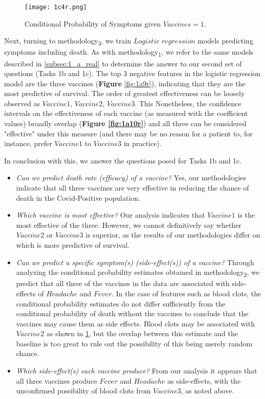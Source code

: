\begin{figure}[H]
  \texttt{[image: 1c4r.png]}
  \caption{Conditional  Probability  of  Symptoms  given $Vaccines = 1$.}
    \label{fig:1c4r}
\end{figure}


Next, turning to methodology\textsubscript{3}, we train $Logistic$ $regression$ models predicting symptoms including death. As with methodology\textsubscript{1}, we refer to the same models described in \ref{subsec:1_a_real} to determine the answer to our second set of questions (Tasks 1b and 1c). The top 3 negative features in the logistic regression model are the three vaccines (\textbf{Figure} \ref{fig:1a9r}), indicating that they are the most predictive of survival. The order of greatest effectiveness can be loosely observed as $Vaccine1$, $Vaccine2$, $Vaccine3$. This  Nonetheless, the confidence intervals on the effectiveness of each vaccine (as measured with the coefficient values) broadly overlap (\textbf{Figure \ref{fig:1a10r}}) and all three can be considered "effective" under this measure (and there may be no reason for a patient to, for instance, prefer $Vaccine1$ to $Vaccine3$ in practice). 


In conclusion with this, we answer the questions posed for Tasks 1b and 1c. 
\begin{itemize}
\item \textit{Can we predict death rate (efficacy) of a vaccine?}
Yes, our methodologies indicate that all three vaccines are very effective in reducing the chance of death in the Covid-Positive population.

\item \textit{Which vaccine is most effective?}
Our analysis indicates that $Vaccine1$ is the most effective of the three. However, we cannot definitively say whether $Vaccine2$ or $Vaccine3$ is superior, as the results of our methodologies differ on which is more predictive of survival.

\item \textit{Can we predict a specific symptom(s) (side-effect(s)) of a vaccine?}
Through analyzing the conditional probability estimates obtained in methodology\textsubscript{2}, we predict that all three of the vaccines in the data are associated with side-effects of $Headache$ and $Fever$. In the case of features such as blood clots, the conditional probability estimates do not differ sufficiently from the conditional probability of death without the vaccines to conclude that the vaccines may cause them as side effects. Blood clots may be associated with $Vaccine2$ as shown in \ref{fig:1c4r}, but the overlap between this estimate and the baseline is too great to rule out the possibility of this being merely random chance.

\item \textit{Which side-effect(s) each vaccine produce?}
From our analysis it appears that all three vaccines produce $Fever$ and $Headache$ as side-effects, with the unconfirmed possibility of blood clots from $Vaccine3$, as noted above.
\end{itemize}
